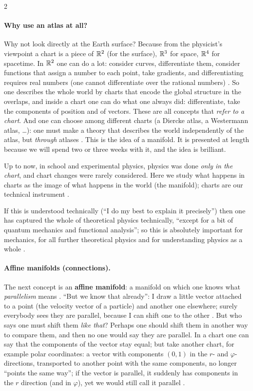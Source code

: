 \begin{paracol}{2}
\paragraph{Why use an atlas at all?} Why not look directly at the Earth surface? 
Because from the physicist's viewpoint a chart is a piece of $\mathbb{R}^2$ (for the surface), $\mathbb{R}^3$ for space, $\mathbb{R}^4$ for
spacetime. In $\mathbb{R}^2$ one can do a lot: consider curves, differentiate them, consider functions that assign a number to
each point, take gradients, and differentiating requires real numbers (one cannot differentiate over the rational
numbers) . So one describes the whole world by charts that encode the global
structure in the overlaps, and inside a chart one can do what one always did: differentiate, take the components of
position and of vectors. These are all concepts that \emph{refer to a chart}. And one can choose among different charts
(a Diercke atlas, a Westermann atlas, \dots): one must make a theory that describes the world independently of the atlas,
but \emph{through} atlases . This is the idea of a manifold. It is
presented at length because we will spend two or three weeks with it, and the idea is brilliant.

\begin{definition}\label{def:bv-programme}
Up to now, in school and experimental physics, physics was done \emph{only in the chart}, and chart changes were rarely
considered. Here we study what happens in charts as the image of what happens in the world (the manifold); charts are our
technical instrument .
\end{definition}
If this is understood technically (``I do my best to explain it precisely'') then one has captured the whole of
theoretical physics technically, ``except for a bit of quantum mechanics and functional analysis''; so this is absolutely
important for mechanics, for all further theoretical physics and for understanding physics as a whole
.

\paragraph{Affine manifolds (connections).} The next concept is an \textbf{affine manifold}: a manifold on which one
knows what \emph{parallelism} means . ``But we know that already'': I draw a little vector attached
to a point (the velocity vector of a particle) and another one elsewhere; surely everybody sees they are parallel,
because I can shift one to the other . But who says one must shift
them \emph{like that}? Perhaps one should shift them in another way to compare them, and then no one would say they are
parallel. In a chart one can say that the components of the vector stay equal; but take another chart, for example polar
coordinates: a vector with components $(0,1)$ in the $r$- and $\varphi$-directions, transported to another point with the
same components, no longer ``points the same way''; if the vector is parallel, it suddenly has components in the $r$
direction (and in $\varphi$), yet we would still call it parallel .


\end{paracol}
